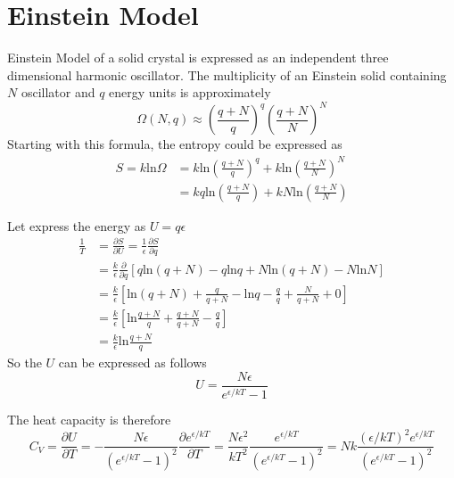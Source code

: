 
\section{Einstein Model}
Einstein Model of a solid crystal is expressed as an independent three dimensional harmonic oscillator.
The multiplicity of an Einstein solid containing $N$ oscillator and $q$ energy units is approximately
\begin{equation} 
\Omega(N, q) \approx (\frac{q+N}{q})^q (\frac{q+N}{N})^N
\end{equation}
Starting with this formula, the entropy could be expressed as 
\begin{equation} 
\begin{split}
S = k\textrm{ln}\Omega &= k\textrm{ln}(\frac{q+N}{q})^q + k\textrm{ln}(\frac{q+N}{N})^N\\
                       &= kq\textrm{ln}(\frac{q+N}{q}) + kN\textrm{ln}(\frac{q+N}{N})
\end{split}
\end{equation}

Let express the energy as $U = q\epsilon$ 
\begin{equation}
\begin{split}
\frac{1}{T} &= \frac{\partial S}{\partial U} = \frac{1}{\epsilon}\frac{\partial S}{\partial q} \\
            &= \frac{k}{\epsilon} \frac{\partial}{\partial q}[q\textrm{ln}(q+N) - q\textrm{ln}q + N\textrm{ln}(q+N) - N\textrm{ln}N] \\
            &= \frac{k}{\epsilon} [\textrm{ln}(q+N) + \frac{q}{q+N} - \textrm{ln}q  - \frac{q}{q} +  \frac{N}{q+N} + 0] \\
            &= \frac{k}{\epsilon} [\textrm{ln}\frac{q+N}{q} + \frac{q+N}{q+N} - \frac{q}{q}] \\
            &= \frac{k}{\epsilon} \textrm{ln}\frac{q+N}{q} 
\end{split}
\end{equation}
So the $U$ can be expressed as follows
\begin{equation}
U = \frac{N\epsilon}{e^{\epsilon/kT}-1}
\end{equation}

The heat capacity is therefore
\begin{equation}
C_V =  \frac{\partial U}{\partial T} 
    = -\frac{N\epsilon}{(e^{\epsilon/kT}-1)^2} \frac{\partial e^{\epsilon/kT}}{\partial T} 
    =  \frac{N\epsilon^2}{kT^2} \frac{e^{\epsilon/kT}}{(e^{\epsilon/kT}-1)^2}
    =  Nk \frac{ (\epsilon/kT)^2  e^{\epsilon/kT}}{(e^{\epsilon/kT}-1)^2}
\end{equation}

